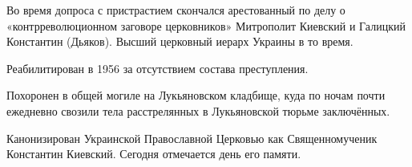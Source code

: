 Во время допроса с пристрастием скончался арестованный по делу о
«контрреволюционном заговоре церковников»  Митрополит Киевский и Галицкий
Константин (Дьяков). Высший церковный иерарх Украины в то время. 

Реабилитирован в 1956 за отсутствием состава преступления. 

Похоронен в общей могиле на Лукьяновском кладбище, куда по ночам  почти
ежедневно свозили тела расстрелянных в Лукьяновской тюрьме заключённых.  

Канонизирован Украинской Православной Церковью как Священномученик
Константин Киевский. Сегодня отмечается день его памяти.

